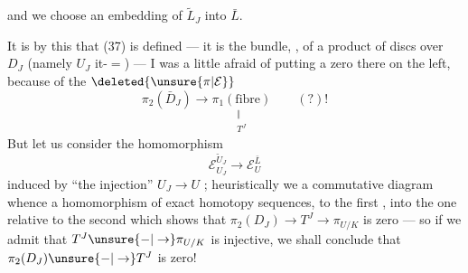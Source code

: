 
and we choose an embedding of $\tilde L_J$ into $\bar L$.

It is by this that (37) is defined --- it is the  bundle, , of a product of discs over $D_J$ (namely $U_J$ it-$=$) --- I was a little afraid of putting a zero there on the left, because of the $\deleted{\unsure{\pi|\mathcal E}}$
\[
\pi_2(\bar D_J)\longrightarrow
\underset{\substack{\Vert\\ T^J}}{\pi_1(\text{fibre})}
\qquad (?)!
\]
But let us consider the homomorphism
\[
\mathcal E_{U_J}^{\tilde U_J}\longrightarrow\mathcal E_U^{\bar L}
\]
induced by ``the injection'' $U_J\longrightarrow U$ ;  heuristically we  a commutative diagram 
whence a homomorphism of exact homotopy sequences,  to the first , into the one relative to the second
which shows that  $\pi_2(D_J)\longrightarrow T^J\longrightarrow\pi_{U/K}$ is zero --- so if we admit that $T^J\unsure{-|\to}\pi_{U/K}$ is injective, we shall conclude that $\pi_2(D_J)\unsure{-|\to}T^J$ is zero!

